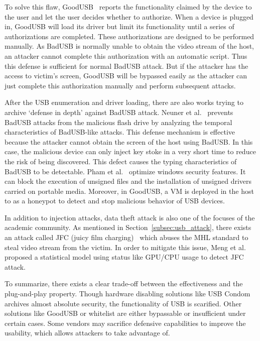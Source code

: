To solve this flaw, GoodUSB~\cite{tian2015defending} reports the functionality claimed
by the device to the user and let the user decides whether to authorize. When a device
is plugged in, GoodUSB will load its driver but limit its functionality until a
series of authorizations are completed. These authorizations are designed to be
performed manually. As BadUSB is normally unable to obtain the video stream of
the host, an attacker cannot complete this authorization with
an automatic script. Thus this defense is sufficient for normal BadUSB attack. But
if the attacker has the access to victim's screen, GoodUSB will be bypassed
easily as the attacker can just complete this authorization manually and
perform subsequent attacks.

After the USB enumeration and driver loading, there are
also works trying to archive `defense in depth'
against BadUSB attack.  Neuner et 
al.~\cite{neuner2018usblock}
prevents BadUSB attacks from the malicious flash drive by analyzing
the temporal characteristics of BadUSB-like attacks. This defense mechanism is
effective because the attacker cannot obtain the screen of the host using
BadUSB. In this case, the malicious device can only inject key stoke in a very
short time to reduce the risk of being discovered. This defect causes the
typing characteristics of BadUSB to be detectable. Pham et
al.~\cite{pham2010optimizing} optimize windows security features. It can
block the execution of unsigned files and the installation of unsigned drivers
carried on portable media. Moreover, in GoodUSB, a VM is deployed in the host to as
a honeypot to detect and stop malicious behavior of USB devices.

In addition to injection attacks, data theft attack is also one of the focuses
of the academic community. As mentioned in Section~\ref{subsec:usb_attack}, there
exists an attack called JFC (juicy film charging)~\cite{JFC} which abuses the MHL
standard to steal video stream from the victim. In order to mitigate this
issue, Meng et al.~\cite{meng2018252} proposed a statistical model using status
like GPU/CPU usage to detect JFC attack.

To summarize, there exists a clear trade-off between the effectiveness and the
plug-and-play property. Though hardware disabling solutions like USB Condom
archives almost absolute security, the functionality of USB is scarified.
Other solutions like GoodUSB or whitelist are either bypassable or insufficient
under certain cases.  Some vendors may sacrifice defensive capabilities to
improve the usability, which allows attackers to take advantage of.

